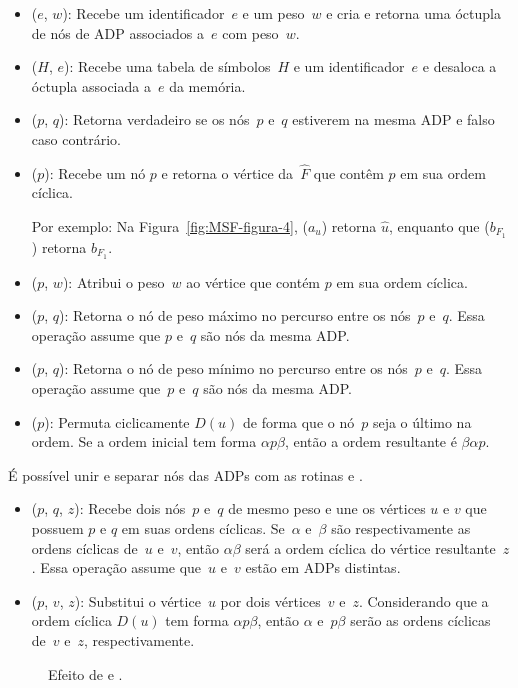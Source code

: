 \begin{itemize}
\item \LCOMakeOcto($e$, $w$): Recebe um identificador~$e$ e um peso~$w$ e cria e retorna uma óctupla de nós de ADP associados a~$e$ com peso~$w$.
\item \LCODestroyOcto($H$, $e$): Recebe uma tabela de símbolos~$H$ e um identificador~$e$ e desaloca a óctupla associada a~$e$ da memória.

\item \LCOConnected($p$, $q$): Retorna verdadeiro se os nós~$p$ e~$q$ estiverem na mesma ADP e falso caso contrário.
\item \LCOFindNode($p$): Recebe um nó $p$ e retorna o vértice da~$\hat F$ que contêm $p$ em sua ordem cíclica.

Por exemplo: Na Figura~\ref{fig:MSF-figura-4}, \LCOFindNode($a_u$) retorna $\hat u$, enquanto que \LCOFindNode($b_{F_1}$) retorna $\hat b_{F_1}$.
\item \LCOAddCost($p$, $w$): Atribui o peso~$w$ ao vértice que contém $p$ em sua ordem cíclica.
\item \LCOMax($p$, $q$): Retorna o nó de peso máximo no percurso entre os nós~$p$ e~$q$.
Essa operação assume que $p$ e~$q$ são nós da mesma ADP.
\item \LCOMin($p$, $q$): Retorna o nó de peso mínimo no percurso entre os nós~$p$ e~$q$.
Essa operação assume que~$p$ e~$q$ são nós da mesma ADP.
\item \LCOCycle($p$): Permuta ciclicamente $D(u)$ de forma que o nó~$p$ seja o último na ordem.
Se a ordem inicial tem forma $\alpha p \beta$, então a ordem resultante é $\beta\alpha p$.
\end{itemize}

É possível unir e separar nós das ADPs com as rotinas \LCOMerge{} e \LCOSplit{}.

\begin{itemize}
\item \LCOMerge($p$, $q$, $z$): Recebe dois nós~$p$ e~$q$ de mesmo peso e une os vértices $u$ e $v$ que possuem $p$ e $q$ em suas ordens cíclicas.
Se~$\alpha$ e~$\beta$ são respectivamente as ordens cíclicas de~$u$ e~$v$, então $\alpha\beta$ será a ordem cíclica do vértice resultante~$z$. 
Essa operação assume que~$u$ e~$v$ estão em ADPs distintas.

\item \LCOSplit($p$, $v$, $z$): Substitui o vértice~$u$ por dois vértices~$v$ e~$z$.
Considerando que a ordem cíclica $D(u)$ tem forma $\alpha p\beta$, então $\alpha$ e~$p\beta$ serão as ordens cíclicas de~$v$ e~$z$, respectivamente.

\end{itemize}
\begin{figure}[htb]
\scalebox{1}{
\centering

}
\caption{Efeito de \LCOMerge{} e \LCOSplit{}.}
\label{fig:MSF-Merge-Split}
\end{figure}



